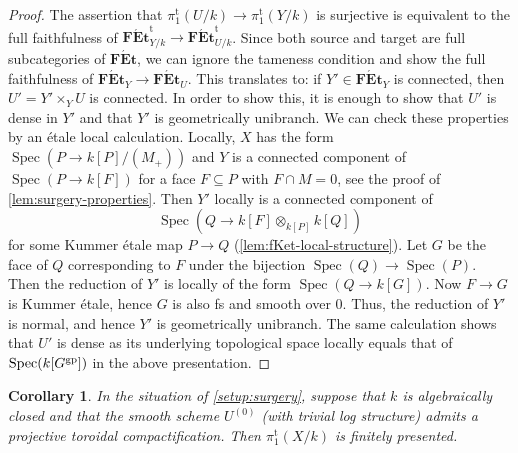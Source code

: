 \documentclass[a4paper,twoside,11pt,reqno]{amsart}
\DeclareMathOperator{\Spec}{Spec}
\newcommand{\cat}[1]{\mathbf{#1}}
\newcommand{\FEt}{\cat{F\acute{E}t}}
\newcommand{\pitame}{\pi_1^{\mathrm{t}}}
\newcommand{\FEtt}{{\cat{F\acute{E}t}}^{\!\mathrm{t}}}
\newtheorem{cor}[thm]{Corollary}
\theoremstyle{definition}
\numberwithin{equation}{subsection}
\begin{document}
\begin{proof}
The assertion that $\pitame(U/k)\to\pitame(Y/k)$ is surjective is equivalent to the full faithfulness of $\FEtt_{Y/k}\to\FEtt_{U/k}$. Since both source and target are full subcategories of $\FEt$, we can ignore the tameness condition and show the full faithfulness of $\FEt_Y\to\FEt_U$. This translates to: if $Y'\in \FEt_Y$ is connected, then $U' = Y'\times_Y U$ is connected. In order to show this, it is enough to show that $U'$ is dense in $Y'$ and that $Y'$ is geometrically unibranch. We can check these properties by an étale local calculation. Locally, $X$ has the form $\Spec(P\to k[P]/(M_+))$ and $Y$ is a connected component of $\Spec(P\to k[F])$ for a face $F \subseteq P$ with $F \cap M = 0$, see the proof of \cref{lem:surgery-properties}. Then $Y'$ locally is a connected component of  
\[
    \Spec(Q \to k[F]\otimes_{k[P]} k[Q])
\]
for some Kummer \'etale map $P \to Q$ (\cref{lem:fKet-local-structure}). Let $G$ be the face of $Q$ corresponding to $F$ under the bijection $\Spec(Q) \to \Spec(P)$. Then the reduction of $Y'$ is locally of the form $\Spec(Q \to k[G])$. Now $F \to G$ is Kummer \'etale, hence $G$ is also fs and smooth over $0$.
Thus, the reduction of $Y'$ is normal, and hence $Y'$ is geometrically unibranch. The same calculation shows that $U'$ is dense as its underlying topological space locally equals that of $\Spec(k[G^{\rm gp}])$ in the above presentation.
\end{proof}

\begin{cor} \label{cor:surgery-fp}
    In the situation of \cref{setup:surgery}, suppose that $k$ is algebraically closed and that the smooth scheme $U^{(0)}$ (with trivial log structure) admits a projective toroidal  compactification. Then $\pitame(X/k)$ is finitely presented. 
\end{cor}
\end{document}

